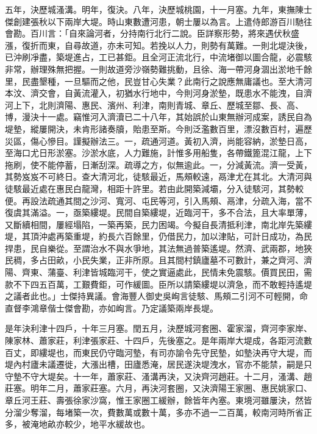 \begin{pinyinscope}
五年，決歷城溞溝。明年，復決。八年，決歷城桃園，十一月塞。九年，東撫陳士傑創建張秋以下兩岸大堤。時山東數遭河患，朝士屢以為言。上遣侍郎游百川馳往會勘。百川言：「自來論河者，分持南行北行二說。臣詳察形勢，將來遇伏秋盛漲，復折而東，自尋故道，亦未可知。若挽以人力，則勢有萬難。一則北堤決後，已沖刷凈盡，築堤進占，工已甚鉅。且全河正流北行，中流堵御以圖合龍，必震駭非常，辦理殊無把握。一則故道旁沙嶺勢難挑動，且徐、海一帶河身涸出淤地千餘里，民盡墾種，一旦驅而之他，民豈甘心失業？此南行之說應無庸議也。至大清河本汶、濟交會，自黃流灌入，初猶水行地中，今則河身淤墊，既患水不能洩，自濟河上下，北則濟陽、惠民、濱州、利津，南則青城、章丘、歷城至鄒、長、高、博，漫決十一處。竊惟河入濟瀆已二十八年，其始誤於山東無辦河成案，誘民自為堤墊，縱屢開決，未肯形諸奏牘，貽患至斯。今則泛濫數百里，漂沒數百村，遍歷災區，傷心慘目。謹擬辦法三。一，疏通河道。黃初入濟，尚能容納，淤墊日高，至海口尤日形淤塞。沙淤水底，人力難施，計惟多用船隻，各帶鐵篦混江龍，上下拖刷，使不能停蓄，日漸刮深。疏導之方，似無逾此。一，分減黃流。濟一受黃，其勢岌岌不可終日。查大清河北，徒駭最近，馬頰較遠，鬲津尤在其北。大清河與徒駭最近處在惠民白龍灣，相距十許里。若由此開築減壩，分入徒駭河，其勢較便。再設法疏通其間之沙河、寬河、屯民等河，引入馬頰、鬲津，分疏入海，當不復虞其滿溢。一，亟築縷堤。民間自築縷堤，近臨河干，多不合法，且大率單薄，又斷續相間，屢經塌陷，一築再築，民力困竭。今擬自長清抵利津，南北岸先築縷堤，其頂沖處再築重堤，約長六百餘里，仍借民力，加以津貼，可計日成功，為民捍患，民自樂從。至謂治水不與水爭地，其法無過普築遙堤。然濟、武兩郡，地狹民稠，多占田畝，小民失業，正非所原。且其間村鎮廬墓不可數計，兼之齊河、濟陽、齊東、蒲臺、利津皆城臨河干，使之實逼處此，民情未免震駭。價買民田，需款不下四五百萬，工艱費鉅，可作緩圖。臣所以請築縷堤以濟急，而不敢輕持遙堤之議者此也。」士傑持異議。會海豐人御史吳峋言徒駭、馬頰二引河不可輕開，命直督李鴻章偕士傑會勘，亦如峋言。乃定議築兩岸長堤。

是年決利津十四戶，十年三月塞。閏五月，決歷城河套圈、霍家溜，齊河李家岸、陳家林、蕭家莊，利津張家莊、十四戶，先後塞之。是年兩岸大堤成，各距河流數百丈，即縷堤也，而東民仍守臨河墊，有司亦諭令先守民墊，如墊決再守大堤，而堤內村廬未議遷徙，大漲出槽，田廬悉淹，居民遂決堤洩水，官亦不能禁，嗣是只守墊不守大堤矣。十一年，蕭家莊、溞溝再決，又決齊河趙莊。十二月，溞溝、趙莊塞。明年二月，蕭家莊塞。六月，再決河套圈，又決濟陽王家圈、惠民姚家口、章丘河王莊、壽張徐家沙窩，惟王家圈工緩辦，餘皆年內塞。東境河雖屢決，然皆分溜少奪溜，每堵築一次，費數萬或數十萬，多亦不過一二百萬，較南河時所省正多，被淹地畝亦較少，地平水緩故也。


\end{pinyinscope}
